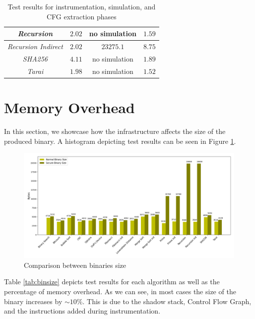 \begin{table}
\begin{tabular}{|c|c|c|c|}
    \hline
    \textit{Recursion}                   & $2.02$                        & no simulation            & $1.59$                       \\
    \hline
    \textit{Recursion Indirect}          & $2.02$                        & $23275.1$                & $8.75$                       \\
    \hline
    \textit{SHA256}                      & $4.11$                        & no simulation            & $1.89$                       \\
    \hline
    \textit{Tarai}                       & $1.98$                        & no simulation            & $1.52$                       \\
    \hline
  \end{tabular}
  \caption{Test results for instrumentation, simulation, and CFG extraction
  phases}
  \label{tab:othertimes}
\end{table}

\section{Memory Overhead}
\label{sec:pa_memory}

In this section, we showcase how the infrastructure affects the size of the
produced binary. A histogram depicting test results can be seen in Figure \ref{fig:binsize}.

\begin{figure}[htbp]
  \centering
  \includegraphics[width=\linewidth]{images/size.png}
  \caption{Comparison between binaries size}
  \label{fig:binsize}
\end{figure}

Table \ref{tab:binsize} depicts test results for each algorithm as well as the
percentage of memory overhead. As we can see, in most cases the size of the
binary increases by $\sim 10\%$. This is due to the shadow stack, Control Flow
Graph, and the instructions added during instrumentation.

